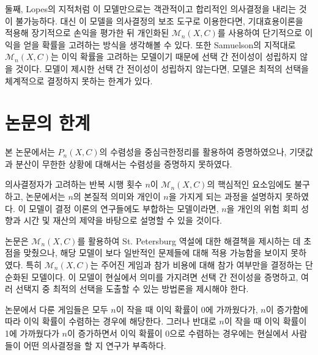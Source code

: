둘째, Lopes의 지적처럼 이 모델만으로는 객관적이고 합리적인 의사결정을 내리는 것이 불가능하다. 대신 이 모델을 의사결정의 보조 도구로 이용한다면, 기대효용이론을 적용해 장기적으로 손익을 평가한 뒤 개인화된 $\mathcal{M}_n(X, C)$를 사용하여 단기적으로 이익을 얻을 확률을 고려하는 방식을 생각해볼 수 있다. 또한 Samuelson의 지적대로 $\mathcal{M}_n(X, C)$는 이익 확률을 고려하는 모델이기 때문에 선택 간 전이성이 성립하지 않을 것이다. 모델이 제시한 선택 간 전이성이 성립하지 않는다면, 모델은 최적의 선택을 체계적으로 결정하지 못하는 한계가 있다.

\section*{논문의 한계}

본 논문에서는 $P_n(X, C)$의 수렴성을 중심극한정리를 활용하여 증명하였으나, 기댓값과 분산이 무한한 상황에 대해서는 수렴성을 증명하지 못하였다.

의사결정자가 고려하는 반복 시행 횟수 $n$이 $\mathcal{M}_n(X, C)$의 핵심적인 요소임에도 불구하고, 논문에서는 $n$의 본질적 의미와 개인이 $n$을 가지게 되는 과정을 설명하지 못하였다. 이 모델이 결정 이론의 연구들에도 부합하는 모델이라면, $n$을 개인의 위험 회피 성향과 시간 및 재산의 제약을 바탕으로 설명할 수 있을 것이다.

논문은 $\mathcal{M}_n(X, C)$를 활용하여 St. Petersburg 역설에 대한 해결책을 제시하는 데 초점을 맞췄으나, 해당 모델이 보다 일반적인 문제들에 대해 적용 가능함을 보이지 못하였다. 특히 $\mathcal{M}_n(X, C)$는 주어진 게임과 참가 비용에 대해 참가 여부만을 결정하는 단순화된 모델이다. 이 모델이 현실에서 의미를 가지려면 선택 간 전이성을 증명하고, 여러 선택지 중 최적의 선택을 도출할 수 있는 방법론을 제시해야 한다.

논문에서 다룬 게임들은 모두 $n$이 작을 때 이익 확률이 0에 가까웠다가, $n$이 증가함에 따라 이익 확률이 수렴하는 경우에 해당한다. 그러나 반대로 $n$이 작을 때 이익 확률이 1에 가까웠다가 $n$이 증가하면서 이익 확률이 0으로 수렴하는 경우에는 현실에서 사람들이 어떤 의사결정을 할 지 연구가 부족하다.
